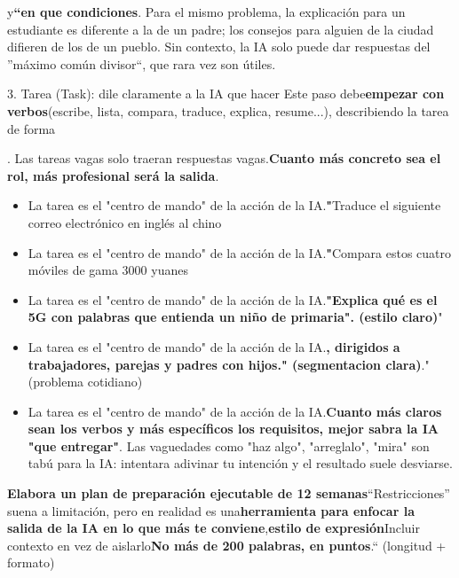 
y\textbf{“en que condiciones}. Para el mismo problema, la explicación para un estudiante es diferente a la de un padre; los consejos para alguien de la ciudad difieren de los de un pueblo. Sin contexto, la IA solo puede dar respuestas del ”máximo común divisor“, que rara vez son útiles.

\begin{tcbinfo}{3. Tarea (Task): dile claramente a la IA que hacer}
Este paso debe\textbf{empezar con verbos}(escribe, lista, compara, traduce, explica, resume...), describiendo la tarea de forma

\end{tcbinfo}


. Las tareas vagas solo traeran respuestas vagas.\textbf{Cuanto más concreto sea el rol, más profesional será la salida}.

\booksubsection{(}

\begin{itemize}
  \item La tarea es el "centro de mando" de la acción de la IA.\textbf{"}Traduce el siguiente correo electrónico en inglés al chino
  \item La tarea es el "centro de mando" de la acción de la IA.\textbf{"}Compara estos cuatro móviles de gama 3000 yuanes
  \item La tarea es el "centro de mando" de la acción de la IA.\textbf{"Explica qué es el 5G con palabras que entienda un niño de primaria". (estilo claro)}"
  \item La tarea es el "centro de mando" de la acción de la IA.\textbf{, dirigidos a trabajadores, parejas y padres con hijos." (segmentacion clara)}." (problema cotidiano)
  \item La tarea es el "centro de mando" de la acción de la IA.\textbf{Cuanto más claros sean los verbos y más específicos los requisitos, mejor sabra la IA "que entregar"}. Las vaguedades como "haz algo", "arreglalo", "mira" son tabú para la IA: intentara adivinar tu intención y el resultado suele desviarse.
\end{itemize}

\textbf{Elabora un plan de preparación ejecutable de 12 semanas}“Restricciones” suena a limitación, pero en realidad es una\textbf{herramienta para enfocar la salida de la IA en lo que más te conviene},\textbf{estilo de expresión}Incluir contexto en vez de aislarlo\textbf{No más de 200 palabras, en puntos}.“ (longitud + formato)

